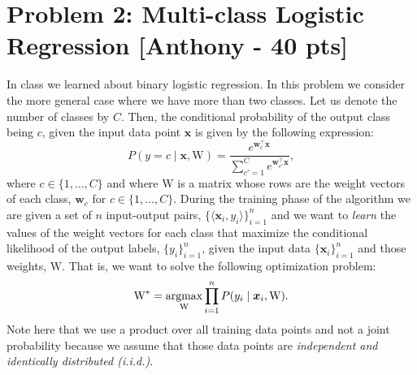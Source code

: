 \section*{Problem 2: Multi-class Logistic Regression [Anthony - 40 pts]}


In class we learned about binary logistic regression. In this problem we consider the more general case where we have more than two classes. Let us denote the number of classes by $C$. Then, the conditional probability of the output class being $c$, given the input data point $\boldsymbol{x}$ is given by the following expression:
\begin{equation*}
	P(y=c\mid\boldsymbol{x},\text{W})=\frac{e^{\boldsymbol{w}_c^\top\boldsymbol{x}}}{\sum_{c'=1}^C{e^{\boldsymbol{w}_{c'}^\top\boldsymbol{x}}}},
\end{equation*}
where $c\in\{1,\hdots,C\}$ and where $\text{W}$ is a matrix whose rows are the weight vectors of each class, $\boldsymbol{w}_c$ for $c\in\{1,\hdots,C\}$. During the training phase of the algorithm we are given a set of $n$ input-output pairs, $\{\langle\boldsymbol{x}_i,y_i\rangle\}_{i=1}^n$ and we want to {\em learn} the values of the weight vectors for each class that maximize the conditional likelihood of the output labels, $\{y_i\}_{i=1}^n$, given the input data $\{\boldsymbol{x}_i\}_{i=1}^n$ and those weights, $\text{W}$. That is, we want to solve the following optimization problem:
\begin{equation*}
	\text{W}^*=\operatorname*{\mathrm{argmax}}_{\text{W}}{\prod_{i=1}^n{P(y_i\mid\boldsymbol{x}_i,\text{W})}}.
\end{equation*}
Note here that we use a product over all training data points and not a joint probability because we assume that those data points are {\em independent and identically distributed (i.i.d.)}.

